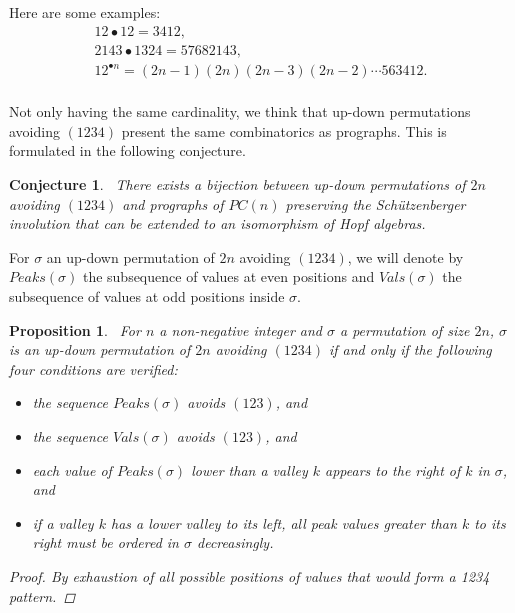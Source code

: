 \documentclass{amsart}
\newtheorem{proposition}[theorem]{Proposition}
\newtheorem{conjecture}[theorem]{Conjecture}
\begin{document}
Here are some examples:
\begin{equation}
  \begin{array}{c}
  12 \bullet 12 = 3412, \\
  2143 \bullet 1324 = 57682143, \\
  12^{\bullet n} = (2n-1)(2n)(2n-3)(2n -2) \cdots 563412. \\
  \end{array}
\end{equation}

Not only having the same cardinality, we think that up-down
permutations avoiding $(1234)$ present the same combinatorics as
prographs. This is formulated in the following conjecture.

\begin{conjecture}~\label{conj1234}
  There exists a bijection between up-down permutations of $2n$
  avoiding $(1234)$ and prographs of $PC(n)$ preserving the
  Schützenberger involution that can be extended to an isomorphism
  of Hopf algebras.
\end{conjecture}

For $\sigma$ an up-down permutation of $2n$ avoiding $(1234)$, we
will denote by $Peaks(\sigma)$ the subsequence of values at even
positions and $Vals(\sigma)$ the subsequence of values at odd positions
inside $\sigma$.

\begin{proposition}~\label{prop_cond}
  For $n$ a non-negative integer and $\sigma$ a permutation of size
  $2n$, $\sigma$ is an up-down permutation of $2n$ avoiding $(1234)$
  if and only if the following four conditions are verified:
  \begin{itemize}
    \item the sequence $Peaks(\sigma)$ avoids $(123)$, and
    \item the sequence $Vals(\sigma)$ avoids $(123)$, and
    \item each value of $Peaks(\sigma)$ lower than a valley $k$ appears
      to the right of $k$ in $\sigma$, and
    \item if a valley $k$ has a lower valley to its left, all peak
      values greater than $k$ to its right must be ordered in
      $\sigma$ decreasingly.
  \end{itemize}
  \begin{proof}
    By exhaustion of all possible positions of values that
    would form a 1234 pattern.
  \end{proof}
\end{proposition}
\end{document}
